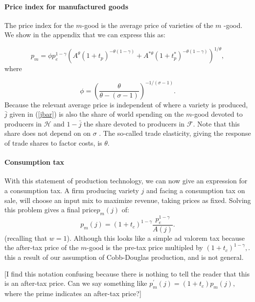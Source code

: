 \documentclass[notitlepage,12pt]{article}
\begin{document}
\paragraph{Price index for manufactured goods}

The price index for the $m$-good is the average price of varieties of the $m$%
-good. We show in the appendix that we can express this as:

\begin{equation*}
p_{m}=\phi p_{e}^{1-\gamma }\left( A^{\theta }\left( 1+t_{p}\right)
^{-\theta \left( 1-\gamma \right) }+A^{\ast \theta }\left( 1+t_{p}^{\ast
}\right) ^{-\theta \left( 1-\gamma \right) }\right) ^{1/\theta },
\end{equation*}%
where

\begin{equation*}
\phi =\left( \frac{\theta }{\theta -\left( \sigma -1\right) }\right)
^{-1/\left( \sigma -1\right) }.
\end{equation*}%
Because the relevant average price is independent of where a variety is
produced, $\bar{j}$ given in (\ref{jbar}) is also the share of world
spending on the $m$-good devoted to producers in $\mathcal{H}$ and $1-\bar{j}
$ the share devoted to producers in $\mathcal{F}$. Note that this share does
not depend on on $\sigma $ . The so-called trade elasticity, giving the
response of trade shares to factor costs, is $\theta $.

\paragraph{Consumption tax}

With this statement of production technology, we can now give an expression
for a consumption tax. A firm producing variety $j$ and facing a consumption
tax on sale, will choose an input mix to maximize revenue, taking prices as
fixed. Solving this problem gives a final price$p_{m}\left( j\right) $ of:%
\begin{equation*}
p_{m}(j)=\left( 1+t_{c}\right) ^{1-\gamma }\frac{p_{e}^{1-\gamma }}{A(j)}.
\end{equation*}%
(recalling that $w=1$). Although this looks like a simple ad valorem tax
because the after-tax price of the $m$-good is the pre-tax price multipled
by $\left( 1+t_{c}\right) ^{1-\gamma },$. this a result of our assumption of
Cobb-Douglas production, and is not general.

[I find this notation confusing because there is nothing to tell the reader
that this is an after-tax price. Can we say something like $p_{m}^{\prime
}\left( j\right) =\left( 1+t_{c}\right) p_{m}\left( j\right) ,$ where the
prime indicates an after-tax price?]
\end{document}
